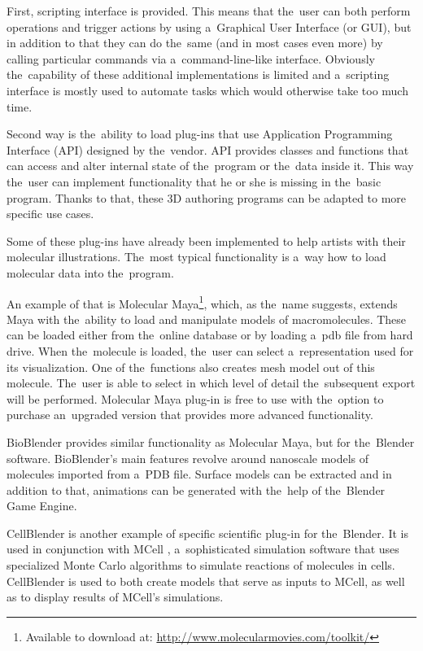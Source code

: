 \documentclass[
  digital, %
  table,   %
  nolof,     %
  nolot,     %
  oneside,
]{fithesis3}
\begin{document}
First, scripting interface is provided. This means that the user can both perform operations and trigger actions by using a Graphical User Interface (or GUI), but in addition to that they can do the same (and in most cases even more) by calling particular commands via a command-line-like interface. Obviously the capability of these additional implementations is limited and a scripting interface is mostly used to automate tasks which would otherwise take too much time.

Second way is the ability to load plug-ins that use Application Programming Interface (API) designed by the vendor. API provides classes and functions that can access and alter internal state of the program or the data inside it. This way the user can implement functionality that he or she is missing in the basic program. Thanks to that, these 3D authoring programs can be adapted to more specific use cases.

Some of these plug-ins have already been implemented to help artists with their molecular illustrations. The most typical functionality is a way how to load molecular data into the program.

An example of that is Molecular Maya\footnote{Available to download at: \url{http://www.molecularmovies.com/toolkit/}}, which, as the name suggests, extends Maya with the ability to load and manipulate models of macromolecules. These can be loaded either from the online database or by loading a pdb file from hard drive. When the molecule is loaded, the user can select a representation used for its visualization. One of the functions also creates mesh model out of this molecule. The user is able to select in which level of detail the subsequent export will be performed. Molecular Maya plug-in is free to use with the option to purchase an upgraded version that provides more advanced functionality.

BioBlender provides similar functionality as Molecular Maya, but for the Blender software. BioBlender's main features revolve around nanoscale models of molecules imported from a PDB file. Surface models can be extracted and in addition to that, animations can be generated with the help of the Blender Game Engine.

CellBlender is another example of specific scientific plug-in for the Blender. It is used in conjunction with MCell \cite{mcell}, a sophisticated simulation software that uses specialized Monte Carlo algorithms to simulate reactions of molecules in cells. CellBlender is used to both create models that serve as inputs to MCell, as well as to display results of MCell's simulations.
\end{document}
